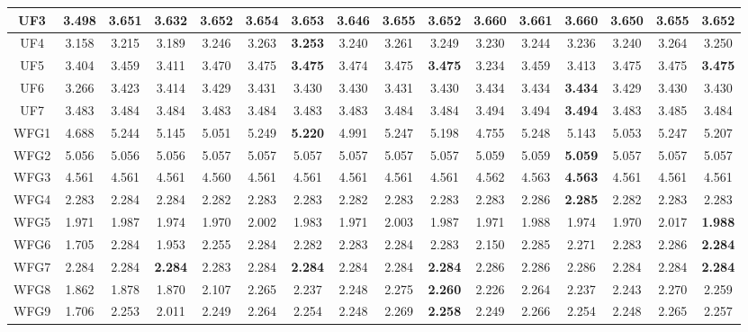 \begin{table}[]
{\begin{tabular}{c|c|c|c|c|c|c|c|c|c|c|c|c|c|c|c|}
\multicolumn{1}{|c|}{UF3} & 3.498 & 3.651 & 3.632 & 3.652 & 3.654 & 3.653 & 3.646 & 3.655 & 3.652 & 3.660 & 3.661 & \textbf{3.660} & 3.650 & 3.655 & 3.652 \\ \hline
\multicolumn{1}{|c|}{UF4} & 3.158 & 3.215 & 3.189 & 3.246 & 3.263 & \textbf{3.253} & 3.240 & 3.261 & 3.249 & 3.230 & 3.244 & 3.236 & 3.240 & 3.264 & 3.250 \\ \hline
\multicolumn{1}{|c|}{UF5} & 3.404 & 3.459 & 3.411 & 3.470 & 3.475 & \textbf{3.475} & 3.474 & 3.475 & \textbf{3.475} & 3.234 & 3.459 & 3.413 & 3.475 & 3.475 & \textbf{3.475} \\ \hline
\multicolumn{1}{|c|}{UF6} & 3.266 & 3.423 & 3.414 & 3.429 & 3.431 & 3.430 & 3.430 & 3.431 & 3.430 & 3.434 & 3.434 & \textbf{3.434} & 3.429 & 3.430 & 3.430 \\ \hline
\multicolumn{1}{|c|}{UF7} & 3.483 & 3.484 & 3.484 & 3.483 & 3.484 & 3.483 & 3.483 & 3.484 & 3.484 & 3.494 & 3.494 & \textbf{3.494} & 3.483 & 3.485 & 3.484 \\ \hline
\multicolumn{1}{|c|}{WFG1} & 4.688 & 5.244 & 5.145 & 5.051 & 5.249 & \textbf{5.220} & 4.991 & 5.247 & 5.198 & 4.755 & 5.248 & 5.143 & 5.053 & 5.247 & 5.207 \\ \hline
\multicolumn{1}{|c|}{WFG2} & 5.056 & 5.056 & 5.056 & 5.057 & 5.057 & 5.057 & 5.057 & 5.057 & 5.057 & 5.059 & 5.059 & \textbf{5.059} & 5.057 & 5.057 & 5.057 \\ \hline
\multicolumn{1}{|c|}{WFG3} & 4.561 & 4.561 & 4.561 & 4.560 & 4.561 & 4.561 & 4.561 & 4.561 & 4.561 & 4.562 & 4.563 & \textbf{4.563} & 4.561 & 4.561 & 4.561 \\ \hline
\multicolumn{1}{|c|}{WFG4} & 2.283 & 2.284 & 2.284 & 2.282 & 2.283 & 2.283 & 2.282 & 2.283 & 2.283 & 2.283 & 2.286 & \textbf{2.285} & 2.282 & 2.283 & 2.283 \\ \hline
\multicolumn{1}{|c|}{WFG5} & 1.971 & 1.987 & 1.974 & 1.970 & 2.002 & 1.983 & 1.971 & 2.003 & 1.987 & 1.971 & 1.988 & 1.974 & 1.970 & 2.017 & \textbf{1.988} \\ \hline
\multicolumn{1}{|c|}{WFG6} & 1.705 & 2.284 & 1.953 & 2.255 & 2.284 & 2.282 & 2.283 & 2.284 & 2.283 & 2.150 & 2.285 & 2.271 & 2.283 & 2.286 & \textbf{2.284} \\ \hline
\multicolumn{1}{|c|}{WFG7} & 2.284 & 2.284 & \textbf{2.284} & 2.283 & 2.284 & \textbf{2.284} & 2.284 & 2.284 & \textbf{2.284} & 2.286 & 2.286 & 2.286 & 2.284 & 2.284 & \textbf{2.284} \\ \hline
\multicolumn{1}{|c|}{WFG8} & 1.862 & 1.878 & 1.870 & 2.107 & 2.265 & 2.237 & 2.248 & 2.275 & \textbf{2.260} & 2.226 & 2.264 & 2.237 & 2.243 & 2.270 & 2.259 \\ \hline
\multicolumn{1}{|c|}{WFG9} & 1.706 & 2.253 & 2.011 & 2.249 & 2.264 & 2.254 & 2.248 & 2.269 & \textbf{2.258} & 2.249 & 2.266 & 2.254 & 2.248 & 2.265 & 2.257 \\ \hline
\end{tabular}%
}
\end{table}


